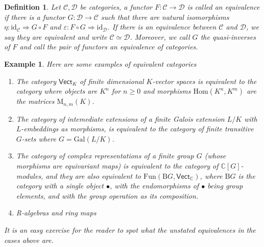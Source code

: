 \documentclass[10pt]{book}
\theoremstyle{bookplain}
\theoremstyle{bookdefinition}
\newtheorem{definition}[theorem]{Definition}
\newtheorem{example}[theorem]{Example}
\theoremstyle{bookremark}
\begin{document}
\begin{definition}Let $\mathscr{C},\mathscr{D}$ be categories, a functor $F:\mathscr{C}\rightarrow \mathscr{D}$ is called an \textit{equivalence} if there is a functor $G:\mathscr{D}\rightarrow\mathscr{C}$ such that there are natural isomorphisms $\eta:\mathrm{id}_{\mathscr{C}}\Rightarrow G\circ F$ and $\varepsilon:F\circ G\Rightarrow\mathrm{id}_{\mathscr{D}}$. 
    If there is an equivalence between $\mathscr{C}$ and $\mathscr{D}$, we say they are \textit{equivalent} and write $\mathscr{C} \simeq \mathscr{D}$. Moreover, we call $G$ the \textit{quasi-inverses} of $F$ and call the pair of functors an \textit{equivalence of categories}. 
\end{definition}

\begin{example}Here are some examples of equivalent categories
    \begin{enumerate}
        \item The category $\mathsf{Vect}_K$ of finite dimensional $K$-vector spaces is equivalent to the category where objects are $K^n$ for $n\ge 0$ and morphisms $\mathrm{Hom}(K^n,K^m)$ are the matrices $\mathrm M_{n,m}(K)$. 
        \item The category of intemediate extensions of a finite Galois extension $L/K$ with $L$-embeddings as morphisms, is equivalent to the category of finite transitive $G$-sets where $G=\mathrm{Gal}(L/K)$. 
        \item The category of complex representations of a finite group $G$ (whose morphisms are equivariant maps) is equivalent to the category of $\mathbb C[G]$-modules, and they are also equivalent to $\mathrm{Fun}(\mathrm BG,\mathsf{Vect}_{\mathbb C})$, where $\mathrm B G$ is the category with a single object $\bullet$, with the endomorphisms of $\bullet$ being group elements, and with the group operation as its composition. 
        \item R-algebras and ring maps
    \end{enumerate}
    It is an easy exercise for the reader to spot what the unstated equivalences in the cases above are.
\end{example}
\end{document}
